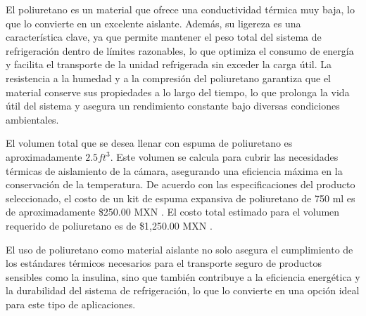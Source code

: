   El poliuretano es un material que ofrece una conductividad térmica muy baja, lo que lo convierte en un excelente aislante. Además, su ligereza es una característica clave, ya que permite mantener el peso total del sistema de refrigeración dentro de límites razonables, lo que optimiza el consumo de energía y facilita el transporte de la unidad refrigerada sin exceder la carga útil. La resistencia a la humedad y a la compresión del poliuretano garantiza que el material conserve sus propiedades a lo largo del tiempo, lo que prolonga la vida útil del sistema y asegura un rendimiento constante bajo diversas condiciones ambientales.
  
  El volumen total que se desea llenar con espuma de poliuretano es aproximadamente $2.5 ft^3$. Este volumen se calcula para cubrir las necesidades térmicas de aislamiento de la cámara, asegurando una eficiencia máxima en la conservación de la temperatura. De acuerdo con las especificaciones del producto seleccionado, el costo de un kit de espuma expansiva de poliuretano de 750 ml es de aproximadamente  {\$250.00 MXN }. El costo total estimado para el volumen requerido de poliuretano es de {\$1,250.00 MXN} \cite{poliuretanohomedepot}.
  
  El uso de poliuretano como material aislante no solo asegura el cumplimiento de los estándares térmicos necesarios para el transporte seguro de productos sensibles como la insulina, sino que también contribuye a la eficiencia energética y la durabilidad del sistema de refrigeración, lo que lo convierte en una opción ideal para este tipo de aplicaciones.
  
 
